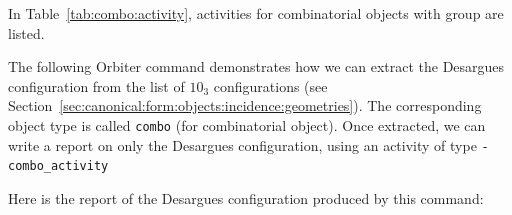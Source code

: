 In Table~\ref{tab:combo:activity}, 
activities for combinatorial objects with group are listed.


\bigskip



The following Orbiter command demonstrates how we can extract the Desargues configuration 
from the list of $10_3$ configurations (see Section~\ref{sec:canonical:form:objects:incidence:geometries}).
The corresponding object type is called \verb'combo' (for combinatorial object).
Once extracted, we can write a report on only the Desargues configuration, 
using an activity of type \verb'-combo_activity'



Here is the report of the Desargues configuration produced by this command:




